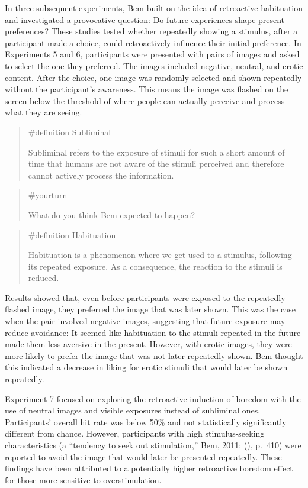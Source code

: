 \documentclass[
  letterpaper,
]{book}
\begin{document}
In three subsequent experiments, Bem built on the idea of retroactive
habituation and investigated a provocative question: Do future
experiences shape present preferences? These studies tested whether
repeatedly showing a stimulus, after a participant made a choice, could
retroactively influence their initial preference. In Experiments 5 and
6, participants were presented with pairs of images and asked to select
the one they preferred. The images included negative, neutral, and
erotic content. After the choice, one image was randomly selected and
shown repeatedly without the participant's awareness. This means the
image was flashed on the screen below the threshold of where people can
actually perceive and process what they are seeing.

\begin{quote}
\label{def-subliminal}{\#definition} Subliminal

Subliminal refers to the exposure of stimuli for such a short amount of
time that humans are not aware of the stimuli perceived and therefore
cannot actively process the information.
\end{quote}

\begin{quote}
{\#yourturn}

What do you think Bem expected to happen?
\end{quote}

\begin{quote}
\label{def-habituation}{\#definition} Habituation

Habituation is a phenomenon where we get used to a stimulus, following
its repeated exposure. As a consequence, the reaction to the stimuli is
reduced.
\end{quote}

Results showed that, even before participants were exposed to the
repeatedly flashed image, they preferred the image that was later shown.
This was the case when the pair involved negative images, suggesting
that future exposure may reduce avoidance: It seemed like habituation to
the stimuli repeated in the future made them less aversive in the
present. However, with erotic images, they were more likely to prefer
the image that was not later repeatedly shown. Bem thought this
indicated a decrease in liking for erotic stimuli that would later be
shown repeatedly.

Experiment 7 focused on exploring the retroactive induction of boredom
with the use of neutral images and visible exposures instead of
subliminal ones. Participants' overall hit rate was below 50\% and not
statistically significantly different from chance. However, participants
with high stimulus-seeking characteristics (a ``tendency to seek out
stimulation,'' Bem, 2011; (),
p.~410) were reported to avoid the image that would later be presented
repeatedly. These findings have been attributed to a potentially higher
retroactive boredom effect for those more sensitive to overstimulation.
\end{document}
